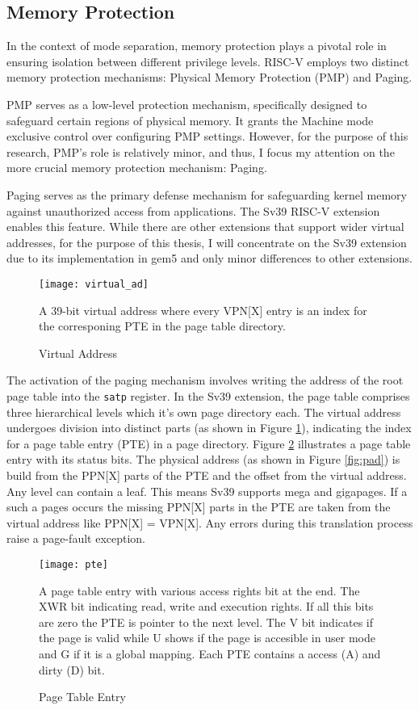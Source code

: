 \subsection{Memory Protection}
In the context of mode separation, memory protection plays a pivotal
role in ensuring isolation between different privilege levels. RISC-V
employs two distinct memory protection mechanisms: Physical Memory Protection
(PMP) and Paging. \par
PMP serves as a low-level protection mechanism, specifically designed to
safeguard certain regions of physical memory. It grants the Machine mode
exclusive control over configuring PMP settings. However, for the purpose of
this research, PMP's role is relatively minor, and thus, I focus my attention
on the more crucial memory protection mechanism: Paging.\par
Paging serves as the primary defense mechanism for safeguarding kernel memory
against unauthorized access from applications. The Sv39 RISC-V extension enables
this feature. While there are other extensions that support wider
virtual addresses, for the purpose of this thesis, I will concentrate on the
Sv39 extension due to its implementation in gem5 and only minor differences to
other extensions.\par
\begin{figure}[h]
    \centering
    \texttt{[image: virtual\_ad]}
    \caption{Virtual Address}
    A 39-bit virtual address where every VPN[X] entry is an index for the
    corresponing PTE in the page table directory.
    \label{fig:virtad}
\end{figure}
The activation of the paging mechanism involves writing the address of the root
page table into the \texttt{satp} register. In the Sv39 extension, the page table
comprises three hierarchical levels which it's own page directory each. The virtual address undergoes division into
distinct parts (as shown in Figure \ref{fig:virtad}), indicating the index for a
page table entry (PTE) in a page directory. Figure \ref{fig:pte} illustrates a page
table entry with its status bits. The physical address (as shown in Figure
\ref{fig:pad}) is build from the PPN[X] parts of the PTE and the offset from the
virtual address. Any level can contain a leaf. This means Sv39 supports mega and
gigapages. If a such a pages occurs the missing PPN[X] parts in the PTE are
taken from the virtual address like PPN[X] = VPN[X]. Any errors during this
translation process raise a page-fault exception.\par
\begin{figure}[h]
    \centering
    \texttt{[image: pte]}
    \caption{Page Table Entry}
    A page table entry with various access rights bit at the end. The XWR bit
    indicating read, write and execution rights. If all this bits are zero the
    PTE is pointer to the next level. The V bit indicates if the page
    is valid while U shows if the page is accesible in user mode and G if it is
    a global mapping. Each PTE contains a access (A) and dirty (D) bit.
    \label{fig:pte}
\end{figure}
